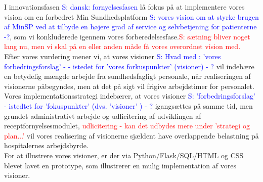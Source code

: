 I innovationsfasen 
\textcolor{blue}{S: dansk: fornyelsesfasen} lå fokus på at implementere  
vores vision om en forbedret Min Sundhedsplatform
\textcolor{blue}{S: vores vision om at styrke brugen af MinSP ved at tilbyde en højere grad af service og selvbetjening for patienterne -?}, som vi konkluderede igennem vores forberedelsesfase.\textcolor{red}{S: sætning bliver noget lang nu, men vi skal på en eller anden måde få vores overordnet vision med.}\\
Efter vores vurdering mener vi, at vores visioner 
\textcolor{blue}{S: Hvad med  : 'vores forbedringsforslag' - - istedet for 'vores forkuspunkter' (visioner) - ?}
 vil indebære en betydelig mængde arbejde fra sundhedsfagligt personale, når realiseringen af visionerne påbegyndes, men at det på sigt vil frigive arbejdstimer for personalet.\\
Vores implementationsstrategi indebærer, at vores visioner 
\textcolor{blue}{S: 'forbedringsforslag' - istedtet for 'fokuspunkter' (dvs. 'visioner' ) - ?}
 igangsættes på samme tid, men grundet administrativt arbejde og udlicitering af udviklingen af receptfornyelsesmodulet,
 \textcolor{red}{udlicitering - kan det udbydes mere under 'strategi og plan...'}
 vil vores realisering af visionerne sjældent have overlappende belastning på hospitalernes arbejdsbyrde.\\
For at illustrere vores visioner, er der via Python/Flask/SQL/HTML og CSS blevet lavet en prototype, som illustrerer en mulig implementation af vores visioner.\\
